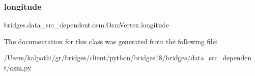 \mbox{\label{classbridges_1_1data__src__dependent_1_1osm_1_1_osm_vertex_a0dd0da0c52e3ca388cf8fbe5f613c273}} 
\subsubsection{\texorpdfstring{longitude}{longitude}}
{\footnotesize\ttfamily bridges.\+data\+\_\+src\+\_\+dependent.\+osm.\+Osm\+Vertex.\+longitude}



The documentation for this class was generated from the following file\+:\begin{DoxyCompactItemize}
\item 
/\+Users/kalpathi/gr/bridges/client/python/bridges18/bridges/data\+\_\+src\+\_\+dependent/\mbox{\hyperlink{osm_8py}{osm.\+py}}\end{DoxyCompactItemize}
